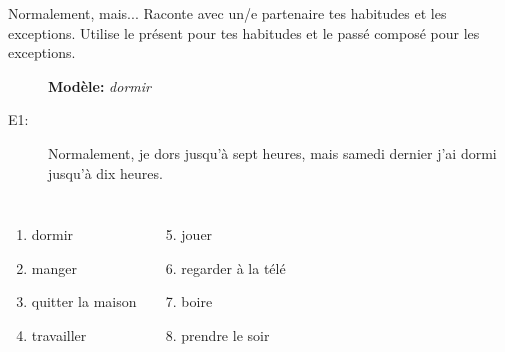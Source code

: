\begin{frame}{Normalement, mais...}
  Raconte avec un/e partenaire tes habitudes et les exceptions.
  Utilise \alert{le présent} pour tes habitudes et \alert{le passé composé} pour les exceptions. \\
  \begin{description}
    \item[] \textbf{Modèle:} \emph{dormir}
    \item[E1:] Normalement, je \alert{dors} jusqu'à sept heures, mais samedi dernier j'\alert{ai dormi} jusqu'à dix heures.
  \end{description}
  \begin{columns}[t]
      \begin{enumerate}
        \item dormir
        \item manger
        \item quitter la maison
        \item travailler
      \end{enumerate}
      \begin{enumerate}
        \setcounter{enumi}{4}
        \item jouer
        \item regarder à la télé
        \item boire
        \item prendre le soir
      \end{enumerate}
  \end{columns}
\end{frame}